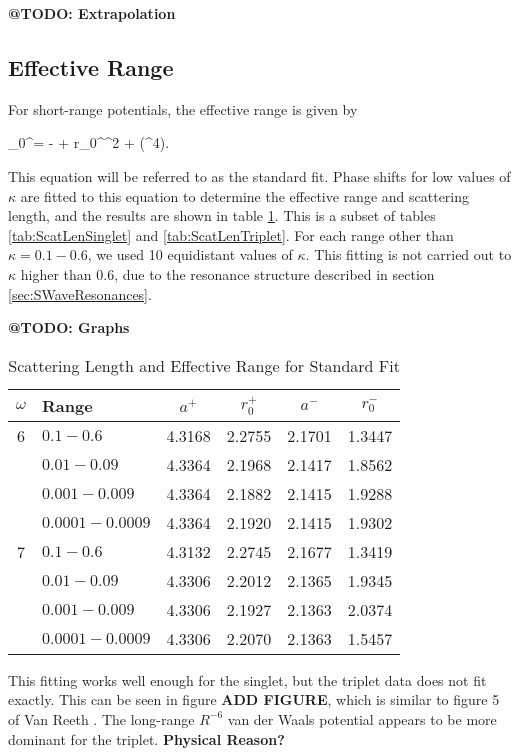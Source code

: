 \documentclass[Dissertation.tex]{subfiles}
\begin{document}
\textbf{@TODO: Extrapolation}


\subsection{Effective Range}
For short-range potentials, the effective range is given by \cite{Bethe1949,Blatt1949,Drake2006}

\beq
\label{eq:EffectiveRangeShort}
\kappa \cot\eta_0^\pm = - +  r_0^\pm \kappa^2 + (\kappa^4).
\eeq

\noindent This equation will be referred to as the standard fit. Phase shifts for low values of $\kappa$ are fitted to this equation to determine the effective range and scattering length, and the results are shown in table \ref{tab:ScatLenStandard}. This is a subset of tables \ref{tab:ScatLenSinglet} and \ref{tab:ScatLenTriplet}. For each range other than $\kappa = 0.1 - 0.6$, we used 10 equidistant values of $\kappa$. This fitting is not carried out to $\kappa$ higher than 0.6, due to the resonance structure described in section \ref{sec:SWaveResonances}.

\textbf{@TODO: Graphs}

\begin{table}[H]
\centering
\begin{tabular}{c l c c c c}
\toprule
$\omega$ & Range & $a^+$ & $r_0^+$ & $a^-$ & $r_0^-$ \\
\midrule
6 & $0.1 - 0.6$ & 4.3168 & 2.2755 & 2.1701 & 1.3447 \\
  & $0.01 - 0.09$ & 4.3364 & 2.1968 & 2.1417 & 1.8562 \\
  & $0.001 - 0.009$ & 4.3364 & 2.1882 & 2.1415 & 1.9288 \\
  & $0.0001 - 0.0009$ & 4.3364 & 2.1920 & 2.1415 & 1.9302 \\
\midrule
7 & $0.1 - 0.6$ & 4.3132 & 2.2745 & 2.1677 & 1.3419 \\
  & $0.01 - 0.09$ & 4.3306 & 2.2012 & 2.1365 & 1.9345 \\
  & $0.001 - 0.009$ & 4.3306 & 2.1927 & 2.1363 & 2.0374 \\
  & $0.0001 - 0.0009$ & 4.3306 & 2.2070 & 2.1363 & 1.5457 \\
\bottomrule
\end{tabular}
\caption{Scattering Length and Effective Range for Standard Fit}
\label{tab:ScatLenStandard}
\end{table}

This fitting works well enough for the singlet, but the triplet data does not fit exactly.  This can be seen in figure \textbf{ADD FIGURE}, which is similar to figure 5 of Van Reeth \cite{VanReeth2003}.  The long-range $R^{-6}$ van der Waals potential appears to be more dominant for the triplet. \textbf{Physical Reason?}
\end{document}
